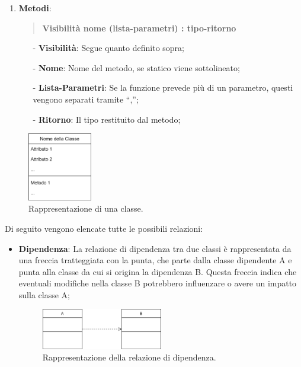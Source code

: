 \documentclass[10pt]{article}
\begin{document}
\begin{justify}
\begin{enumerate}
            \item \textbf{Metodi}:
            \begin{quote}
                \textbf{Visibilità nome (lista-parametri) : tipo-ritorno}
            \end{quote}
            \begin{itemize}
                \item [-] \textbf{Visibilità}: Segue quanto definito sopra;
                \item [-] \textbf{Nome}: Nome del metodo, se statico viene sottolineato;
                \item [-] \textbf{Lista-Parametri}: Se la funzione prevede più di un parametro, questi vengono separati tramite “,”;
                \item [-] \textbf{Ritorno}: Il tipo restituito dal metodo;
            \end{itemize}
        \end{enumerate}
        \begin{figure}[H]
        \centering
        \includegraphics[width=0.25\textwidth]{classe.png}
        \caption{Rappresentazione di una classe.}
        \end{figure}
        
        \vspace{2mm}
        Di seguito vengono elencate tutte le possibili relazioni:
        \begin{itemize}
            \item \textbf{Dipendenza}: La relazione di dipendenza tra due classi è rappresentata da una freccia tratteggiata con la punta, che parte dalla classe dipendente A e punta alla classe da cui si origina la dipendenza B. Questa freccia indica che eventuali modifiche nella classe B potrebbero influenzare o avere un impatto sulla classe A;
            \begin{figure}[H]
            \centering
            \includegraphics[width=0.5\textwidth]{DipendenzaClasse.png}
            \caption{Rappresentazione della relazione di dipendenza.}
            \end{figure}
        

\end{itemize}
\end{justify}
\end{document}
